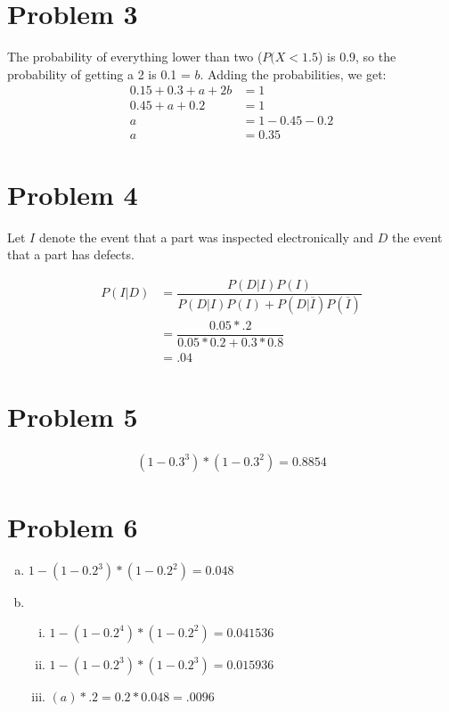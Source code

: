 \documentclass[11pt]{article}
\begin{document}
\section*{Problem 3}
 The probability of everything lower than two ($P(X < 1.5$) is 0.9, so the probability of getting a 2 is 0.1 = $b$. Adding the probabilities, we get:
\begin{align*}
 	0.15 + 0.3 + a + 2b &= 1\\
 	0.45 + a + 0.2 &= 1\\
 	a &= 1-0.45 -0.2\\
 	a &= 0.35
\end{align*}

\section*{Problem 4}
Let $I$ denote the event that a part was inspected electronically and $D$ the event that a part has defects.

\begin{align*}
	P(I | D) &= \dfrac{ P(D | I)P(I) }{P(D | I)P(I) + P(D | \overline{I} )P(\overline{I})}\\
	&= \dfrac{0.05 * .2}{ 0.05 * 0.2 + 0.3 * 0.8}\\
	&= .04
\end{align*}

\section*{Problem 5}
\begin{align*}
	(1-0.3^3) * (1-0.3^2) = 0.8854
\end{align*}

\section*{Problem 6}
\begin{enumerate}[(a)]
	\item $1-(1-0.2 ^3) * (1-0.2 ^2) = 0.048$
	
	\item 
		\begin{enumerate}[i.]
			\item $1-(1- 0.2^4) * (1- 0.2^2) = 0.041536$
			\item $1- (1-0.2^3) * (1- 0.2^3) = 0.015936$
			\item $(a)*.2 = 0.2 * 0.048 = .0096$
		\end{enumerate}
	
\end{enumerate}
\end{document}
